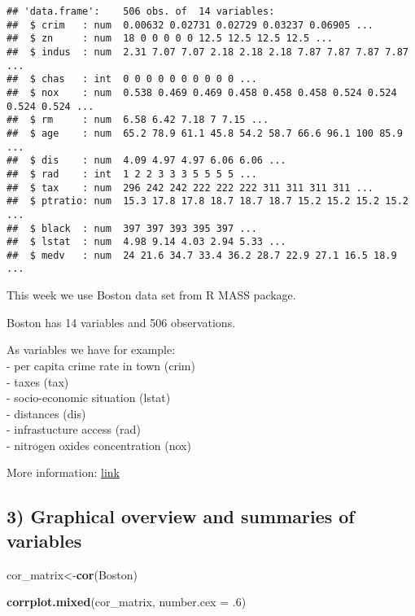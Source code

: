 \documentclass[]{article}
\newenvironment{Shaded}{\begin{snugshade}}{\end{snugshade}}
\newcommand{\KeywordTok}[1]{\textcolor[rgb]{0.13,0.29,0.53}{\textbf{#1}}}
\newcommand{\DataTypeTok}[1]{\textcolor[rgb]{0.13,0.29,0.53}{#1}}
\newcommand{\DecValTok}[1]{\textcolor[rgb]{0.00,0.00,0.81}{#1}}
\newcommand{\NormalTok}[1]{#1}
\begin{document}
\begin{verbatim}
## 'data.frame':    506 obs. of  14 variables:
##  $ crim   : num  0.00632 0.02731 0.02729 0.03237 0.06905 ...
##  $ zn     : num  18 0 0 0 0 0 12.5 12.5 12.5 12.5 ...
##  $ indus  : num  2.31 7.07 7.07 2.18 2.18 2.18 7.87 7.87 7.87 7.87 ...
##  $ chas   : int  0 0 0 0 0 0 0 0 0 0 ...
##  $ nox    : num  0.538 0.469 0.469 0.458 0.458 0.458 0.524 0.524 0.524 0.524 ...
##  $ rm     : num  6.58 6.42 7.18 7 7.15 ...
##  $ age    : num  65.2 78.9 61.1 45.8 54.2 58.7 66.6 96.1 100 85.9 ...
##  $ dis    : num  4.09 4.97 4.97 6.06 6.06 ...
##  $ rad    : int  1 2 2 3 3 3 5 5 5 5 ...
##  $ tax    : num  296 242 242 222 222 222 311 311 311 311 ...
##  $ ptratio: num  15.3 17.8 17.8 18.7 18.7 18.7 15.2 15.2 15.2 15.2 ...
##  $ black  : num  397 397 393 395 397 ...
##  $ lstat  : num  4.98 9.14 4.03 2.94 5.33 ...
##  $ medv   : num  24 21.6 34.7 33.4 36.2 28.7 22.9 27.1 16.5 18.9 ...
\end{verbatim}

This week we use Boston data set from R MASS package.

Boston has 14 variables and 506 observations.

As variables we have for example:\\
- per capita crime rate in town (crim)\\
- taxes (tax)\\
- socio-economic situation (lstat)\\
- distances (dis)\\
- infrastucture access (rad)\\
- nitrogen oxides concentration (nox)

More information:
\href{https://stat.ethz.ch/R-manual/R-devel/library/MASS/html/Boston.html}{link}

\subsection{3) Graphical overview and summaries of
variables}\label{graphical-overview-and-summaries-of-variables}

\begin{Shaded}
\begin{Highlighting}[]
\NormalTok{cor_matrix<-}\KeywordTok{cor}\NormalTok{(Boston) }

\KeywordTok{corrplot.mixed}\NormalTok{(cor_matrix, }\DataTypeTok{number.cex =}\NormalTok{ .}\DecValTok{6}\NormalTok{)}
\end{Highlighting}
\end{Shaded}
\end{document}

